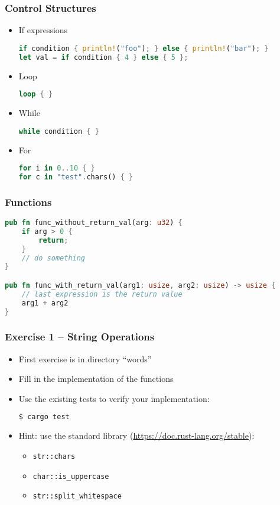 \begin{frame}[fragile]
    \frametitle{Control Structures}

    \begin{itemize}
        \item If expressions
    \begin{lstlisting}[language=rust]
if condition { println!("foo"); } else { println!("bar"); }
let val = if condition { 4 } else { 5 };
    \end{lstlisting}
        \item Loop
    \begin{lstlisting}[language=rust]
loop { }
    \end{lstlisting}
        \item While
    \begin{lstlisting}[language=rust]
while condition { }
    \end{lstlisting}
        \item For
    \begin{lstlisting}[language=rust]
for i in 0..10 { }
for c in "test".chars() { }
    \end{lstlisting}
    \end{itemize}
\end{frame}

\begin{frame}[fragile]
    \frametitle{Functions}

    \begin{lstlisting}[language=rust]
pub fn func_without_return_val(arg: u32) {
    if arg > 0 {
        return;
    }
    // do something
}

pub fn func_with_return_val(arg1: usize, arg2: usize) -> usize {
    // last expression is the return value
    arg1 + arg2
}
    \end{lstlisting}
\end{frame}

\begin{frame}[fragile]
    \frametitle{Exercise 1 -- String Operations}

    \begin{itemize}
        \item First exercise is in directory ``words''
        \item Fill in the implementation of the functions
        \item Use the existing tests to verify your implementation:
    \begin{lstlisting}[language=bash]
$ cargo test
    \end{lstlisting}
        \item Hint: use the standard library (\url{https://doc.rust-lang.org/stable}):
        \begin{itemize}
            \item \texttt{str::chars}
            \item \texttt{char::is\_uppercase}
            \item \texttt{str::split\_whitespace}
        \end{itemize}
    \end{itemize}
\end{frame}
